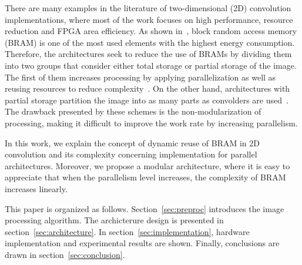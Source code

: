 \documentclass[conference,compsoc]{IEEEtran}
\begin{document}
There are many examples in the literature of two-dimensional (2D) convolution
implementations, where most of the work focuses on high performance, resource
reduction and FPGA area efficiency. As shown in~\cite{paper3}, block random access
memory (BRAM) is one of the most used elements with the highest energy
consumption. Therefore, the architectures seek to reduce the use of BRAMs by
dividing them into two groups that consider either total storage or partial storage of the
image. The first of them increases processing by applying parallelization as
well as reusing resources to reduce complexity~\cite{paper1,paper5}. On the
other hand, architectures with partial storage partition the image into as many
parts as convolders are used~\cite{paper2,paper4}. The drawback presented by
these schemes is the non-modularization of processing, making it difficult to
improve the work rate by increasing parallelism.

In this work, we explain the concept of dynamic reuse of BRAM in 2D convolution
and its complexity concerning implementation for parallel architectures. Moreover, we
propose a modular architecture, where it is easy to appreciate that when the
parallelism level increases, the complexity of BRAM increases linearly.

This paper is organized as follows. Section~\ref{sec:preproc} introduces the
image processing algorithm. The archicterure design is
presented in section~\ref{sec:architecture}. In
section~\ref{sec:implementation}, hardware implementation and experimental
results are shown. Finally, conclusions are drawn in
section~\ref{sec:conclusion}.

%
%
%
%
%
% 
\end{document}
